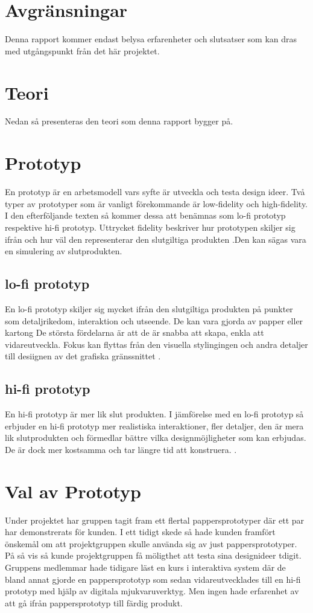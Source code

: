 \section{Avgränsningar}
Denna rapport kommer endast belysa erfarenheter och slutsatser som kan dras med utgångspunkt från det här projektet.

\section{Teori}
Nedan så presenteras den teori som denna rapport bygger på.

\section{Prototyp}
En prototyp är en arbetsmodell vars syfte är utveckla och testa design ideer. Två typer av prototyper som är vanligt förekommande är low-fidelity och high-fidelity. I den efterföljande texten så  kommer dessa att benämnas som lo-fi prototyp respektive hi-fi prototyp. Uttrycket fidelity beskriver hur prototypen skiljer sig ifrån och hur väl den representerar den slutgiltiga produkten \cite{prototypeChoise}.Den kan sägas vara en simulering av slutprodukten.     

\subsection{lo-fi prototyp}
En lo-fi prototyp skiljer sig mycket ifrån den slutgiltiga produkten på punkter som detaljrikedom, interaktion och utseende. De kan vara gjorda av papper eller kartong De största fördelarna är att de är snabba att skapa, enkla att vidareutveckla. Fokus kan flyttas från den visuella stylingingen och andra detaljer till desiignen av det grafiska gränssnittet \cite{prototypeChoise}.

\subsection{hi-fi prototyp}
En hi-fi prototyp är mer lik slut produkten.  I jämförelse med en lo-fi prototyp så erbjuder en hi-fi prototyp mer realistiska interaktioner, fler detaljer, den är mera lik slutprodukten och förmedlar bättre vilka designmöjligheter som kan erbjudas. De är dock mer kostsamma och tar längre tid att konstruera.  \cite{prototypeChoise}.

\section{Val av Prototyp} 
Under projektet har gruppen tagit fram ett flertal pappersprototyper där ett par har demonstrerats för kunden. I ett tidigt skede så hade kunden framfört önskemål om att projektgruppen skulle använda sig av just pappersprototyper. På så vis så kunde projektgruppen få möligthet att testa sina designideer tdigit. Gruppens medlemmar hade tidigare läst en kurs i interaktiva system där de bland annat gjorde en pappersprototyp som sedan vidareutvecklades till en hi-fi prototyp med hjälp av digitala mjukvaruverktyg. Men ingen hade erfarenhet av att gå ifrån pappersprototyp till färdig produkt. 

